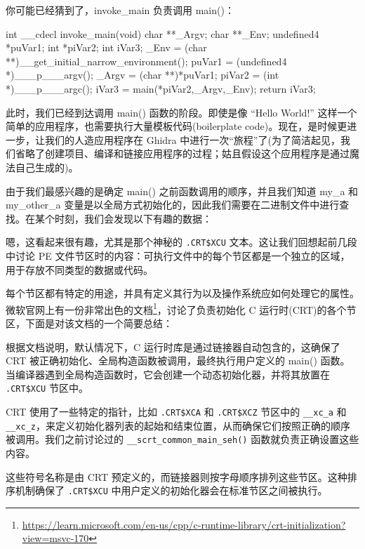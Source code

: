 
你可能已经猜到了，invoke\_main 负责调用 main()：

\begin{cpp}
int __cdecl invoke_main(void) {
  char **_Argv;
  char **_Env;
  undefined4 *puVar1;
  int *piVar2;
  int iVar3;
  _Env = (char **)__get_initial_narrow_environment();
  puVar1 = (undefined4 *)___p___argv();
  _Argv = (char **)*puVar1;
  piVar2 = (int *)___p___argc();
  iVar3 = main(*piVar2,_Argv,_Env);
  return iVar3;
}
\end{cpp}

此时，我们已经到达调用 main() 函数的阶段。即使是像 “Hello World!” 这样一个简单的应用程序，也需要执行大量模板代码(boilerplate code)。现在，是时候更进一步，让我们的人造应用程序在 Ghidra 中进行一次“旅程”了(为了简洁起见，我们省略了创建项目、编译和链接应用程序的过程；姑且假设这个应用程序是通过魔法自己生成的)。

由于我们最感兴趣的是确定 main() 之前函数调用的顺序，并且我们知道 my\_a 和 my\_other\_a 变量是以全局方式初始化的，因此我们需要在二进制文件中进行查找。在某个时刻，我们会发现以下有趣的数据：


嗯，这看起来很有趣，尤其是那个神秘的 \verb|.CRT$XCU| 文本。这让我们回想起前几段中讨论 PE 文件节区时的内容：可执行文件中的每个节区都是一个独立的区域，用于存放不同类型的数据或代码。

每个节区都有特定的用途，并具有定义其行为以及操作系统应如何处理它的属性。微软官网上有一份非常出色的文档\footnote{\url{https://learn.microsoft.com/en-us/cpp/c-runtime-library/crt-initialization?view=msvc-170}}，讨论了负责初始化 C 运行时(CRT)的各个节区，下面是对该文档的一个简要总结：

根据文档说明，默认情况下，C 运行时库是通过链接器自动包含的，这确保了 CRT 被正确初始化、全局构造函数被调用，最终执行用户定义的 main() 函数。当编译器遇到全局构造函数时，它会创建一个动态初始化器，并将其放置在 \verb|.CRT$XCU| 节区中。

CRT 使用了一些特定的指针，比如 \verb|.CRT$XCA| 和 \verb|.CRT$XCZ| 节区中的 \verb|__xc_a| 和 \verb|__xc_z|，来定义初始化器列表的起始和结束位置，从而确保它们按照正确的顺序被调用。我们之前讨论过的 \verb|__scrt_common_main_seh()| 函数就负责正确设置这些内容。

这些符号名称是由 CRT 预定义的，而链接器则按字母顺序排列这些节区。这种排序机制确保了 \verb|.CRT$XCU| 中用户定义的初始化器会在标准节区之间被执行。

